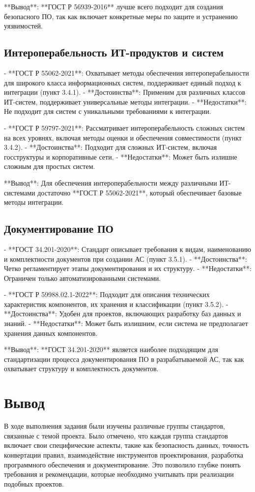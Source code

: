 **Вывод**: **ГОСТ Р 56939-2016** лучше всего подходит для создания безопасного ПО, так как включает конкретные меры по защите и устранению уязвимостей.

\subsection{Интероперабельность ИТ-продуктов и систем}

- **ГОСТ Р 55062-2021**: Охватывает методы обеспечения интероперабельности для широкого класса информационных систем, поддерживает единый подход к интеграции (пункт 3.4.1).
  - **Достоинства**: Применим для различных классов ИТ-систем, поддерживает универсальные методы интеграции.
  - **Недостатки**: Не подходит для систем с уникальными требованиями к интеграции.

- **ГОСТ Р 59797-2021**: Рассматривает интероперабельность сложных систем на всех уровнях, включая методы оценки и обеспечения совместимости (пункт 3.4.2).
  - **Достоинства**: Подходит для сложных ИТ-систем, включая госструктуры и корпоративные сети.
  - **Недостатки**: Может быть излишне сложным для простых систем.

**Вывод**: Для обеспечения интероперабельности между различными ИТ-системами достаточно **ГОСТ Р 55062-2021**, который обеспечивает базовые методы интеграции.

\subsection{Документирование ПО}

- **ГОСТ 34.201-2020**: Стандарт описывает требования к видам, наименованию и комплектности документов при создании АС (пункт 3.5.1).
  - **Достоинства**: Четко регламентирует этапы документирования и их структуру.
  - **Недостатки**: Ограничен только автоматизированными системами.

- **ГОСТ Р 59988.02.1-2022**: Подходит для описания технических характеристик компонентов, их хранения и классификации (пункт 3.5.2).
  - **Достоинства**: Удобен для проектов, включающих разработку баз данных и знаний.
  - **Недостатки**: Может быть излишним, если система не предполагает хранения данных компонентов.

**Вывод**: **ГОСТ 34.201-2020** является наиболее подходящим для стандартизации процесса документирования ПО в разрабатываемой АС, так как охватывает структуру и комплектность документов.

\clearpage

\section*{\LARGE Вывод}

В ходе выполнения задания были изучены различные группы стандартов,
связанные с темой проекта.
Было отмечено, что каждая группа стандартов включает
свои специфические аспекты,
такие как безопасность данных, точность конвертации правил,
взаимодействие инструментов проектирования,
разработка программного обеспечения и документирование.
Это позволило глубже понять требования и рекомендации,
которые необходимо учитывать при реализации подобных проектов.

